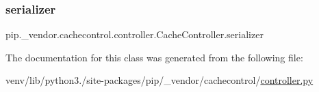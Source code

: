 \subsubsection{\texorpdfstring{serializer}{serializer}}
{\footnotesize\ttfamily pip.\+\_\+vendor.\+cachecontrol.\+controller.\+Cache\+Controller.\+serializer}



The documentation for this class was generated from the following file\+:\begin{DoxyCompactItemize}
\item 
venv/lib/python3./site-\/packages/pip/\+\_\+vendor/cachecontrol/\hyperlink{controller_8py}{controller.\+py}\end{DoxyCompactItemize}
